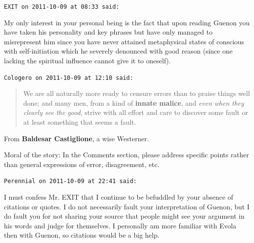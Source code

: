 \begin{footnotesize}
\begin{sffamily}
\hfill

\texttt{EXIT on 2011-10-09 at 08:33 said:}

My only interest in your personal being is the fact that upon reading Guenon you have taken his personality and key phrases but have only managed to misrepresent him since you have never attained metaphysical states of conscious with self-initiation which he severely denounced with good reason (since one lacking the spiritual influence cannot give it to oneself).

\hfill

\texttt{Cologero on 2011-10-09 at 12:10 said:}

\begin{quote}\footnotesize
We are all naturally more ready to censure errors than to praise things well done; and many men, from a kind of \textbf{innate malice}, and \emph{even when they clearly see the good}, strive with all effort and care to discover some fault or at least something that seems a fault.
\end{quote}


From \textbf{Baldesar Castiglione}, a wise Westerner.

Moral of the story: In the Comments section, please address specific points rather than general expressions of error, disagreement, etc.

\hfill

\texttt{Perennial on 2011-10-09 at 22:41 said:}

I must confess Mr. EXIT that I continue to be befuddled by your absence of citations or quotes. I do not necessarily fault your interpretation of Guenon, but I do fault you for not sharing your source that people might see your argument in his words and judge for themselves. I personally am more familiar with Evola then with Guenon, so citations would be a big help.


\hfill

\end{sffamily}
\end{footnotesize}

